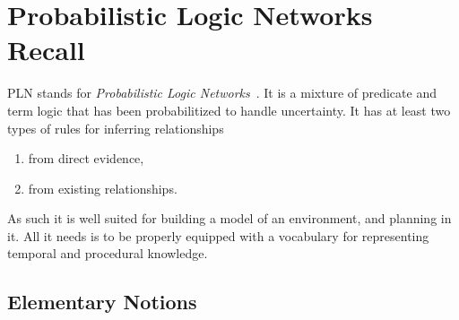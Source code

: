 \documentclass[runningheads]{llncs}
\begin{document}


\section{Probabilistic Logic Networks Recall}
\label{sec:recall}
PLN stands for \emph{Probabilistic Logic
  Networks}~\cite{Goertzel09PLN}.  It is a mixture of predicate and
term logic that has been probabilitized to handle uncertainty.  It has
at least two types of rules for inferring relationships
\begin{enumerate}
\item from direct evidence,
\item from existing relationships.
\end{enumerate}
As such it is well suited for building a model of an environment, and
planning in it.  All it needs is to be properly equipped with a
vocabulary for representing temporal and procedural knowledge.

\subsection{Elementary Notions}


%
%
%

\end{document}
